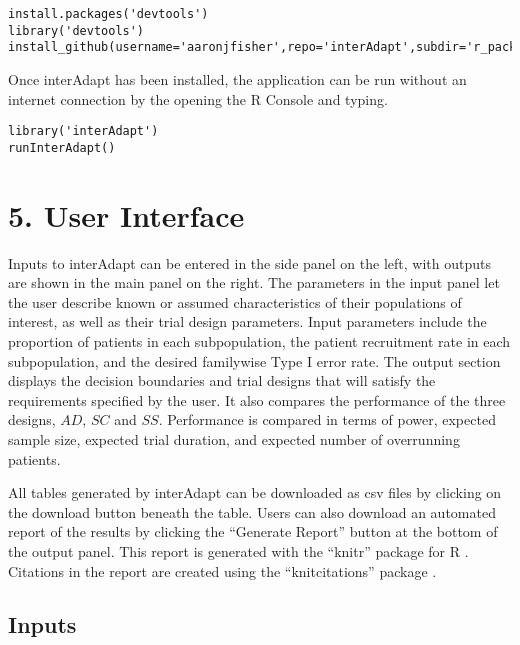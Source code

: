 \documentclass{article}
\newcommand{\interAdapt}{\textsf{interAdapt }}
\begin{document}
\vspace{5 mm}
\begin{verbatim}
install.packages('devtools')
library('devtools')
install_github(username='aaronjfisher',repo='interAdapt',subdir='r_package')
\end{verbatim}
\vspace{5 mm}

Once interAdapt has been installed, the application can be run without an internet connection by the opening the R Console and typing.

\vspace{5 mm}
\begin{verbatim}
library('interAdapt')
runInterAdapt()
\end{verbatim}
\vspace{5 mm}




\section*{5. User Interface}

Inputs to \interAdapt can be entered in the side panel on the left, with outputs are shown in the main panel on the right. %
The parameters in the input panel let the user describe known or assumed characteristics of their populations of interest, as well as their trial design parameters. Input parameters include the proportion of patients in each subpopulation, the patient recruitment rate in each subpopulation, and the desired familywise Type I error rate. The output section displays the decision boundaries and trial designs that will satisfy the requirements specified by the user. It also compares the performance of the three designs, $AD$, $SC$ and $SS$. Performance is compared in terms of power, expected sample size, expected trial duration, and expected number of overrunning patients.

All tables generated by \interAdapt can be downloaded as csv files by clicking on the download button beneath the table. Users can also download an automated report of the results by clicking the ``Generate Report'' button at the bottom of the output panel. This report is generated with the ``knitr'' package for R \cite{knitr}. Citations in the report are created using the ``knitcitations'' package \cite{knitcitations}.

\subsection*{Inputs}
\end{document}
